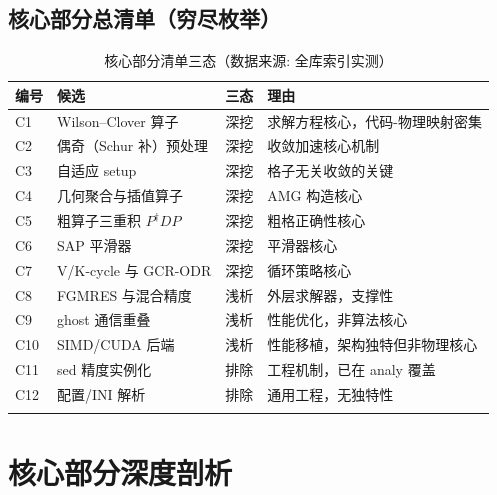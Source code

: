 \documentclass[UTF8]{ctexart}
\begin{document}
\subsection{核心部分总清单（穷尽枚举）}
\begin{xltabular}{\textwidth}{lXXX}
\toprule
\textcolor{map}{编号} & 候选 & 三态 & 理由 \\
\midrule
\endhead
C1 & Wilson--Clover 算子 & 深挖 & 求解方程核心，代码-物理映射密集 \\
C2 & 偶奇（Schur 补）预处理 & 深挖 & 收敛加速核心机制 \\
C3 & 自适应 setup & 深挖 & 格子无关收敛的关键 \\
C4 & 几何聚合与插值算子 & 深挖 & AMG 构造核心 \\
C5 & 粗算子三重积 $P^\dagger D P$ & 深挖 & 粗格正确性核心 \\
C6 & SAP 平滑器 & 深挖 & 平滑器核心 \\
C7 & V/K-cycle 与 GCR-ODR & 深挖 & 循环策略核心 \\
C8 & FGMRES 与混合精度 & 浅析 & 外层求解器，支撑性 \\
C9 & ghost 通信重叠 & 浅析 & 性能优化，非算法核心 \\
C10 & SIMD/CUDA 后端 & 浅析 & 性能移植，架构独特但非物理核心 \\
C11 & sed 精度实例化 & 排除 & 工程机制，已在 analy 覆盖 \\
C12 & 配置/INI 解析 & 排除 & 通用工程，无独特性 \\
\bottomrule
\caption{核心部分清单三态（数据来源: 全库索引实测）}
\end{xltabular}

\section{核心部分深度剖析}
\end{document}
